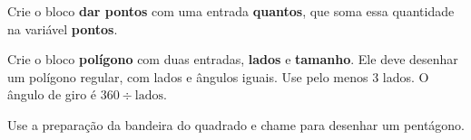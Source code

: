 \begin{exercicio}
Crie o bloco \textbf{dar pontos} com uma entrada \textbf{quantos}, que soma essa quantidade na variável \textbf{pontos}.
\end{exercicio}

\begin{solucao}
\begin{pilha}
\end{pilha}
\begin{pilha}
\end{pilha}
\end{solucao}

\begin{desafio}
Crie o bloco \textbf{polígono} com duas entradas, \textbf{lados} e \textbf{tamanho}. Ele deve desenhar um polígono regular, com lados e ângulos iguais. Use pelo menos 3 lados. O ângulo de giro é $360 \div \text{lados}$.
\end{desafio}

\begin{solucao}
\begin{pilha}
\sbcend
{}
\end{pilha}
Use a preparação da bandeira do quadrado e chame  para desenhar um pentágono.
\end{solucao}
